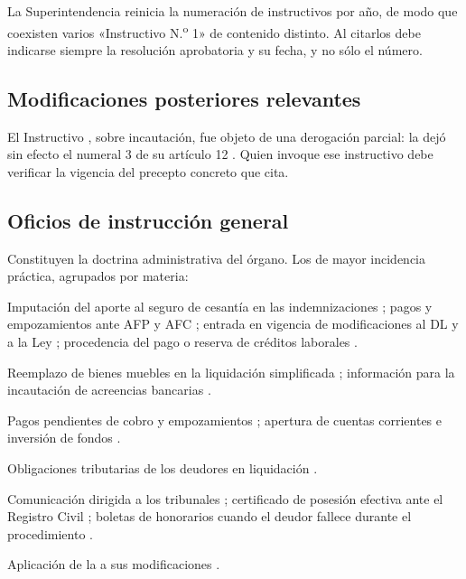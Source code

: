 \begin{alerta}
La Superintendencia reinicia la numeración de instructivos por año, de modo que coexisten
varios «Instructivo N.\textsuperscript{o} 1» de contenido distinto. Al citarlos debe
indicarse siempre la resolución aprobatoria y su fecha, y no sólo el número.
\end{alerta}

\subsection{Modificaciones posteriores relevantes}

El Instructivo , sobre incautación, fue objeto de una derogación parcial: la
 dejó sin efecto el numeral 3 de su artículo 12
\parencite{resex-16492}. Quien invoque ese instructivo debe verificar la vigencia del
precepto concreto que cita.

\subsection{Oficios de instrucción general}

Constituyen la doctrina administrativa del órgano. Los de mayor incidencia práctica,
agrupados por materia:

\begin{description}[leftmargin=0pt,style=nextline,font=\sffamily\bfseries]
  \item[Materia laboral y previsional] Imputación del aporte al seguro de cesantía en las
  indemnizaciones \parencite{oficio-5080}; pagos y empozamientos ante AFP y AFC
  \parencite{oficio-334}; entrada en vigencia de modificaciones al DL  y a la
  Ley  \parencite{oficio-15795}; procedencia del pago o reserva de créditos
  laborales \parencite{oficio-1765, oficio-6499}.

  \item[Realización de activos] Reemplazo de bienes muebles en la liquidación
  simplificada \parencite{oficio-9378}; información para la incautación de acreencias
  bancarias \parencite{oficio-10657}.

  \item[Administración de fondos] Pagos pendientes de cobro y empozamientos
  \parencite{oficio-5003}; apertura de cuentas corrientes e inversión de fondos
  \parencite{oficio-11628}.

  \item[Materia tributaria] Obligaciones tributarias de los deudores en liquidación
  \parencite{oficio-6507, oficio-5209}.

  \item[Actuaciones ante otros órganos] Comunicación dirigida a los tribunales
  \parencite{oficio-16156}; certificado de posesión efectiva ante el Registro Civil
  \parencite{oficio-14006}; boletas de honorarios cuando el deudor fallece durante el
  procedimiento \parencite{oficio-18305}.

  \item[Cajas de compensación] Aplicación de la \LIR{} a sus modificaciones
  \parencite{oficio-23665}.
\end{description}

